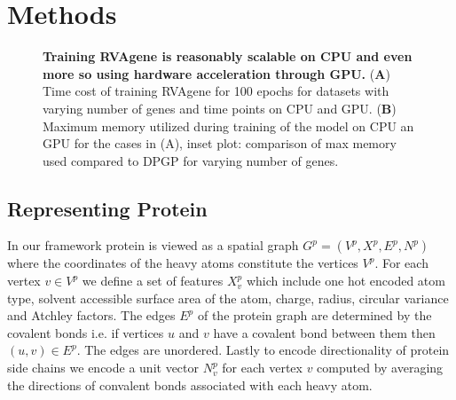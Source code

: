 \section{Methods}
\begin{center}
    \begin{figure}
        \caption[Computational cost of training RVAgene]{\textbf{Training RVAgene is reasonably scalable on CPU and even more so using hardware acceleration through GPU.} ({\bf A}) Time cost of training RVAgene for 100 epochs for datasets with varying number of genes and time points on CPU and GPU. ({\bf B}) Maximum memory utilized during training of the model on CPU an GPU for the cases in (A), inset plot: comparison of max memory used compared to DPGP for varying number of genes.}
  \label{fig:pdna1}
\end{figure}
\end{center}
\subsection{Representing Protein}
In our framework protein is viewed as a spatial graph $G^p = (V^p, X^p, E^p, N^p)$  where the
coordinates of the heavy atoms constitute the vertices $V^p$. For each vertex $v \in V^p$  we define
a set of features $X^p_v$ which include one hot encoded atom type, solvent accessible surface area
of the atom, charge, radius, circular variance and Atchley factors. The edges $E^p$ of the protein
graph  are determined by the covalent bonds i.e. if  vertices $u$ and $v$ have
a covalent bond between them then $(u,v) \in E^p$. The edges are unordered. Lastly to encode
directionality of protein side chains we encode a unit vector $N^p_v$ for each vertex $v$ computed by
averaging the directions of convalent bonds associated with each heavy atom. 
